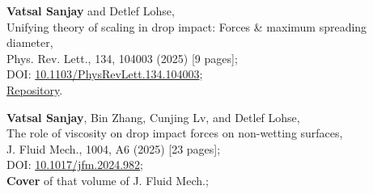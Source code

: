	\item \textbf{Vatsal Sanjay} and Detlef Lohse,\\
	Unifying theory of scaling in drop impact: Forces \& maximum spreading diameter,\\
	Phys. Rev. Lett., 134, 104003 (2025) [9 pages];\\
	\faFile\hspace{0.2em}DOI: \href{https://doi.org/10.1103/PhysRevLett.134.104003}{10.1103/PhysRevLett.134.104003};\\
	\faGithub\hspace{0.2em}\href{https://github.com/comphy-lab/Drop-Impact}{Repository}.

	\item \textbf{Vatsal Sanjay}, Bin Zhang, Cunjing Lv, and Detlef Lohse,\\
	The role of viscosity on drop impact forces on non-wetting surfaces,\\
	J. Fluid Mech., 1004, A6 (2025) [23 pages];\\
	\faFile\hspace{0.2em}DOI: \href{https://doi.org/10.1017/jfm.2024.982}{10.1017/jfm.2024.982};\\
	\faStar\hspace{0.2em}\textbf{Cover} of that volume of J. Fluid Mech.;\\


